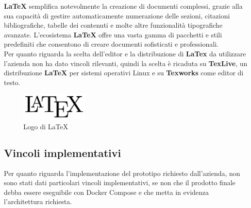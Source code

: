 \noindent \textbf{LaTeX} semplifica notevolmente la creazione di documenti complessi, grazie alla sua capacità di gestire automaticamente numerazione delle sezioni, citazioni bibliografiche, tabelle dei contenuti e molte altre funzionalità tipografiche avanzate.
L'ecosistema \textbf{LaTeX} offre una vasta gamma di pacchetti e stili predefiniti che consentono di creare documenti sofisticati e professionali.
\\Per quanto riguarda la scelta dell'editor e la distribuzione di \textbf{LaTex} da utilizzare l'azienda non ha dato vincoli rilevanti, quindi la scelta è ricaduta su \textbf{TexLive}, un distribuzione \textbf{LaTeX} per sistemi operativi Linux e su \textbf{Texworks} come editor di testo.
\begin{figure}[h]
    \centering
    \includegraphics[width=0.3\textwidth]{images/tecnologie/logo_latex.png}
    \caption{Logo di LaTeX}
    \label{fig:latex}
\end{figure}
\subsection{Vincoli implementativi}
Per quanto riguarda l'implementazione del prototipo richiesto dall'azienda, non sono stati dati particolari vincoli implementativi,
se non che il prodotto finale debba essere eseguibile con Docker Compose e che metta in evidenza l'architettura richiesta. 
\newpage
\pagestyle{empty}
\null %
\newpage